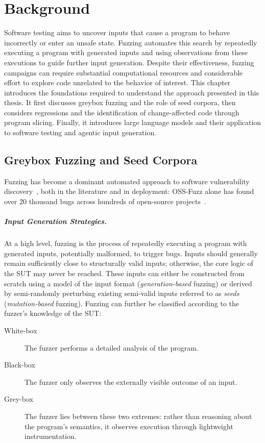 \chapter{Background}\label{chapter:background}

Software testing aims to uncover inputs that cause a program to behave
incorrectly or enter an unsafe state. Fuzzing automates this search by
repeatedly executing a program with generated inputs and using observations from
these executions to guide further input generation. Despite their effectiveness,
fuzzing campaigns can require substantial computational resources and
considerable effort to explore code unrelated to the behavior of interest. This
chapter introduces the foundations required to understand the approach presented
in this thesis. It first discusses greybox fuzzing and the role of seed corpora,
then considers regressions and the identification of change-affected code
through program slicing. Finally, it introduces large language models and their
application to software testing and agentic input generation.

\section{Greybox Fuzzing and Seed Corpora}
\label{sec:greybox}

Fuzzing has become a dominant automated approach to software vulnerability
discovery~\cite{manesArtScienceEngineering2019}, both in the literature and in
deployment: OSS-Fuzz alone has found over 20 thousand bugs across hundreds of
open-source projects~\cite{dingEmpiricalStudyOSSFuzz2021}.

\paragraph{Input Generation Strategies.}
At a high level, fuzzing is the process of repeatedly executing a program with
generated inputs, potentially malformed, to trigger bugs. Inputs should
generally remain sufficiently close to structurally valid inputs; otherwise, the
core logic of the \ac{SUT} may never be reached. These inputs can either be
constructed from scratch using a model of the input format
(\emph{generation-based} fuzzing) or derived by semi-randomly perturbing
existing semi-valid inputs referred to as \emph{seeds} (\emph{mutation-based} fuzzing). 
Fuzzing can further be classified according to the fuzzer's knowledge of the
\ac{SUT}:

\begin{description}
  \item[White-box] The fuzzer performs a detailed analysis of the program.
  \item[Black-box] The fuzzer only observes the externally visible outcome of
    an input.
  \item[Grey-box] The fuzzer lies between these two extremes: rather than
    reasoning about the program's semantics, it observes execution through
    lightweight instrumentation.
\end{description}

